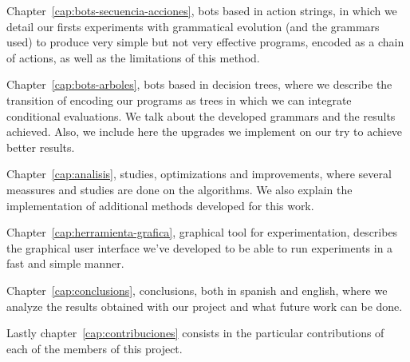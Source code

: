 Chapter~\ref{cap:bots-secuencia-acciones}, bots based in action strings, in which we detail our firsts experiments with grammatical evolution (and the grammars used) to produce very simple but not very effective programs, encoded as a chain of actions, as well as the limitations of this method.

Chapter~\ref{cap:bots-arboles}, bots based in decision trees, where we describe the transition of encoding our programs as trees in which we can integrate conditional evaluations. We talk about the developed grammars and the results achieved. Also, we include here the upgrades we implement on our try to achieve better results.

Chapter~\ref{cap:analisis}, studies, optimizations and improvements, where several meassures and studies are done on the algorithms. We also explain the implementation of additional methods developed for this work.

Chapter~\ref{cap:herramienta-grafica}, graphical tool for experimentation, describes the graphical user interface we’ve developed to be able to run experiments in a fast and simple manner.

Chapter~\ref{cap:conclusions}, conclusions, both in spanish and english, where we analyze the results obtained with our project and what future work can be done.

Lastly chapter~\ref{cap:contribuciones} consists in the particular contributions of each of the members of this project.
